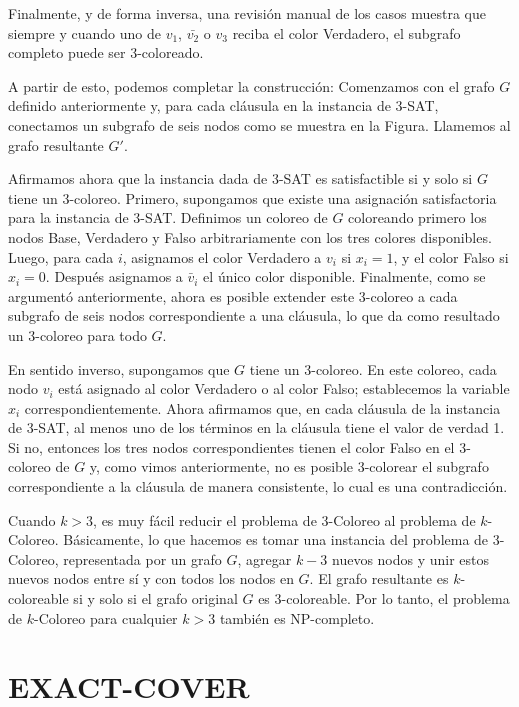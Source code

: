 \documentclass[12pt]{article}
\begin{document}
Finalmente, y de forma inversa, una revisión manual de los casos muestra que siempre y cuando uno de \( v_1 \), \( \bar{v_2} \) o \( v_3 \) reciba el color Verdadero, el subgrafo completo puede ser 3-coloreado.

A partir de esto, podemos completar la construcción: Comenzamos con el grafo \( G \) definido anteriormente y, para cada cláusula en la instancia de 3-SAT, conectamos un subgrafo de seis nodos como se muestra en la Figura. Llamemos al grafo resultante \( G' \).

Afirmamos ahora que la instancia dada de 3-SAT es satisfactible si y solo si \( G \) tiene un 3-coloreo. Primero, supongamos que existe una asignación satisfactoria para la instancia de 3-SAT. Definimos un coloreo de \( G \) coloreando primero los nodos Base, Verdadero y Falso arbitrariamente con los tres colores disponibles. Luego, para cada \( i \), asignamos el color Verdadero a \( v_i \) si \( x_i = 1 \), y el color Falso si \( x_i = 0 \). Después asignamos a \( \bar{v}_i \) el único color disponible. Finalmente, como se argumentó anteriormente, ahora es posible extender este 3-coloreo a cada subgrafo de seis nodos correspondiente a una cláusula, lo que da como resultado un 3-coloreo para todo \( G \).

En sentido inverso, supongamos que \( G \) tiene un 3-coloreo. En este coloreo, cada nodo \( v_i \) está asignado al color Verdadero o al color Falso; establecemos la variable \( x_i \) correspondientemente. Ahora afirmamos que, en cada cláusula de la instancia de 3-SAT, al menos uno de los términos en la cláusula tiene el valor de verdad 1. Si no, entonces los tres nodos correspondientes tienen el color Falso en el 3-coloreo de \( G \) y, como vimos anteriormente, no es posible 3-colorear el subgrafo correspondiente a la cláusula de manera consistente, lo cual es una contradicción.

Cuando \( k > 3 \), es muy fácil reducir el problema de 3-Coloreo al problema de \( k \)-Coloreo. Básicamente, lo que hacemos es tomar una instancia del problema de 3-Coloreo, representada por un grafo \( G \), agregar \( k - 3 \) nuevos nodos y unir estos nuevos nodos entre sí y con todos los nodos en \( G \). El grafo resultante es \( k \)-coloreable si y solo si el grafo original \( G \) es 3-coloreable. Por lo tanto, el problema de \( k \)-Coloreo para cualquier \( k > 3 \) también es NP-completo.


\section*{EXACT-COVER}
\end{document}
